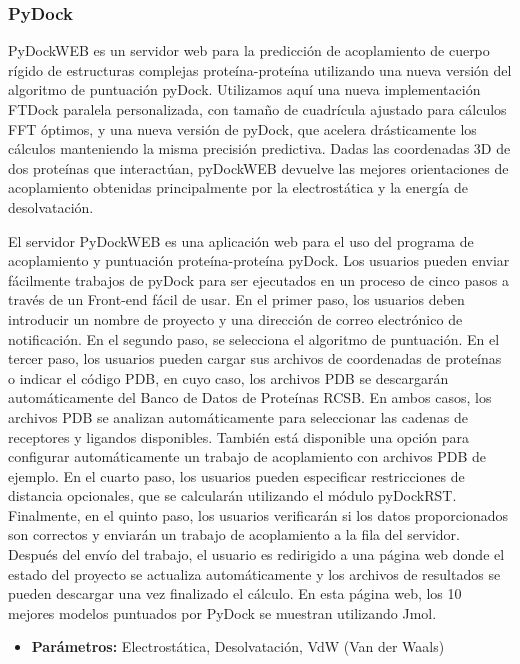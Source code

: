 \documentclass[11pt, letterpaper, spanish]{article}
\begin{document}
{{ \subsubsection{PyDock}
    \par{PyDockWEB es un servidor web para la predicción de acoplamiento de cuerpo rígido de estructuras complejas proteína-proteína utilizando una nueva versión del algoritmo de puntuación pyDock. Utilizamos aquí una nueva implementación FTDock paralela personalizada, con tamaño de cuadrícula ajustado para cálculos FFT óptimos, y una nueva versión de pyDock, que acelera drásticamente los cálculos manteniendo la misma precisión predictiva. Dadas las coordenadas 3D de dos proteínas que interactúan, pyDockWEB devuelve las mejores orientaciones de acoplamiento obtenidas principalmente por la electrostática y la energía de desolvatación.}
    \par{El servidor PyDockWEB es una aplicación web para el uso del programa de acoplamiento y puntuación proteína-proteína pyDock. Los usuarios pueden enviar fácilmente trabajos de pyDock para ser ejecutados en un proceso de cinco pasos a través de un Front-end fácil de usar. En el primer paso, los usuarios deben introducir un nombre de proyecto y una dirección de correo electrónico de notificación. En el segundo paso, se selecciona el algoritmo de puntuación. En el tercer paso, los usuarios pueden cargar sus archivos de coordenadas de proteínas o indicar el código PDB, en cuyo caso, los archivos PDB se descargarán automáticamente del Banco de Datos de Proteínas RCSB. En ambos casos, los archivos PDB se analizan automáticamente para seleccionar las cadenas de receptores y ligandos disponibles. También está disponible una opción para configurar automáticamente un trabajo de acoplamiento con archivos PDB de ejemplo. En el cuarto paso, los usuarios pueden especificar restricciones de distancia opcionales, que se calcularán utilizando el módulo pyDockRST. Finalmente, en el quinto paso, los usuarios verificarán si los datos proporcionados son correctos y enviarán un trabajo de acoplamiento a la fila del servidor. Después del envío del trabajo, el usuario es redirigido a una página web donde el estado del proyecto se actualiza automáticamente y los archivos de resultados se pueden descargar una vez finalizado el cálculo. En esta página web, los 10 mejores modelos puntuados por PyDock se muestran utilizando Jmol.}
\begin{itemize}
    \item  \textbf{Parámetros:} Electrostática, Desolvatación, VdW (Van der Waals)
\end{itemize}
   
}}
\end{document}
